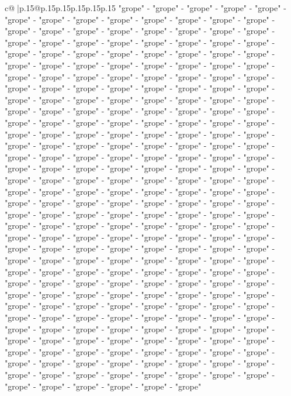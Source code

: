 \documentclass{article}
\begin{document}
{\begin{supertabular}{c@{$\;$}|p{.15\linewidth}@{}p{.15\linewidth}p{.15\linewidth}p{.15\linewidth}p{.15\linewidth}p{.15\linewidth}}
{{{"grope" {-} "grope" {-} "grope" {-} "grope" {-} "grope" {-} "grope" {-} "grope" {-} "grope" {-} "grope" {-} "grope" {-} "grope" {-} "grope" {-} "grope" {-} "grope" {-} "grope" {-} "grope" {-} "grope" {-} "grope" {-} "grope" {-} "grope" {-} "grope" {-} "grope" {-} "grope" {-} "grope" {-} "grope" {-} "grope" {-} "grope" {-} "grope" {-} "grope" {-} "grope" {-} "grope" {-} "grope" {-} "grope" {-} "grope" {-} "grope" {-} "grope" {-} "grope" {-} "grope" {-} "grope" {-} "grope" {-} "grope" {-} "grope" {-} "grope" {-} "grope" {-} "grope" {-} "grope" {-} "grope" {-} "grope" {-} "grope" {-} "grope" {-} "grope" {-} "grope" {-} "grope" {-} "grope" {-} "grope" {-} "grope" {-} "grope" {-} "grope" {-} "grope" {-} "grope" {-} "grope" {-} "grope" {-} "grope" {-} "grope" {-} "grope" {-} "grope" {-} "grope" {-} "grope" {-} "grope" {-} "grope" {-} "grope" {-} "grope" {-} "grope" {-} "grope" {-} "grope" {-} "grope" {-} "grope" {-} "grope" {-} "grope" {-} "grope" {-} "grope" {-} "grope" {-} "grope" {-} "grope" {-} "grope" {-} "grope" {-} "grope" {-} "grope" {-} "grope" {-} "grope" {-} "grope" {-} "grope" {-} "grope" {-} "grope" {-} "grope" {-} "grope" {-} "grope" {-} "grope" {-} "grope" {-} "grope" {-} "grope" {-} "grope" {-} "grope" {-} "grope" {-} "grope" {-} "grope" {-} "grope" {-} "grope" {-} "grope" {-} "grope" {-} "grope" {-} "grope" {-} "grope" {-} "grope" {-} "grope" {-} "grope" {-} "grope" {-} "grope" {-} "grope" {-} "grope" {-} "grope" {-} "grope" {-} "grope" {-} "grope" {-} "grope" {-} "grope" {-} "grope" {-} "grope" {-} "grope" {-} "grope" {-} "grope" {-} "grope" {-} "grope" {-} "grope" {-} "grope" {-} "grope" {-} "grope" {-} "grope" {-} "grope" {-} "grope" {-} "grope" {-} "grope" {-} "grope" {-} "grope" {-} "grope" {-} "grope" {-} "grope" {-} "grope" {-} "grope" {-} "grope" {-} "grope" {-} "grope" {-} "grope" {-} "grope" {-} "grope" {-} "grope" {-} "grope" {-} "grope" {-} "grope" {-} "grope" {-} "grope" {-} "grope" {-} "grope" {-} "grope" {-} "grope" {-} "grope" {-} "grope" {-} "grope" {-} "grope" {-} "grope" {-} "grope" {-} "grope" {-} "grope" {-} "grope" {-} "grope" {-} "grope" {-} "grope" {-} "grope" {-} "grope" {-} "grope" {-} "grope" {-} "grope" {-} "grope" {-} "grope" {-} "grope" {-} "grope" {-} "grope" {-} "grope" {-} "grope" {-} "grope" {-} "grope" {-} "grope" {-} "grope" {-} "grope" {-} "grope" {-} "grope" {-} "grope" {-} "grope" {-} "grope" {-} "grope" {-} "grope" {-} "grope" {-} "grope" {-} "grope" {-} "grope" {-} "grope" {-} "grope" {-} "grope" {-} "grope" {-} "grope" {-} "grope" {-} "grope" {-} "grope" {-} "grope" {-} "grope" {-} "grope" {-} "grope" {-} "grope" {-} "grope" {-} "grope" {-} "grope" {-} "grope" {-} "grope" {-} "grope" {-} "grope" {-} "grope" {-} "grope" {-} "grope" {-} "grope" {-} "grope" {-} "grope" {-} "grope" {-} "grope" {-} "grope" {-} "grope" {-} "grope" {-} "grope" {-} "grope" {-} "grope" {-} "grope" {-} "grope" {-} "grope" {-} "grope" {-} "grope" {-} "grope" {-} "grope" {-} "grope" {-} "grope" {-} "grope" {-} "grope" {-} "grope" {-} "grope" {-} "grope" {-} "grope" {-} "grope" {-} "grope" {-} "grope" {-} "grope" {-} "grope" {-} "grope" {-} "grope" {-} "grope" {-} "grope" {-} "grope" {-} "grope" {-} "grope" {-} "grope" }}}
\end{supertabular}}
\end{document}
